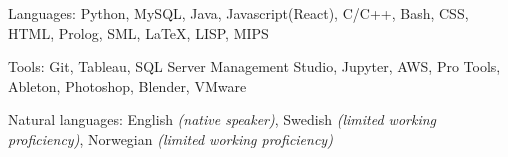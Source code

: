 \documentclass[10pt,letterpaper]{article}
\begin{document}
\spacedhrule{0em}{-0.8em} 









										
\inlineheadsection 
{Languages:}
{Python, MySQL, Java, Javascript(React), C/C++, Bash, CSS, HTML, Prolog, SML, {\LaTeX}, LISP, MIPS}
\vspace{0.5em}
										
										
\inlineheadsection 
{Tools:}
{Git, Tableau, SQL Server Management Studio, Jupyter, AWS, Pro Tools, Ableton, Photoshop, Blender, VMware}
\vspace{0.5em}
										
										
\inlineheadsection 
{Natural languages:}
{English \textit{(native speaker)}, Swedish \textit{(limited working proficiency)}, Norwegian \textit{(limited working proficiency)}}
										
\end{document}
